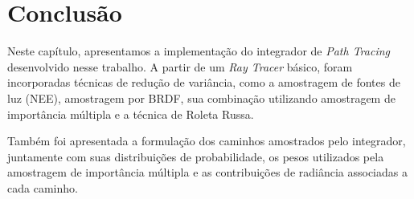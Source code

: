 \section{Conclusão}

Neste capítulo, apresentamos a implementação do integrador de \emph{Path Tracing}
desenvolvido nesse trabalho. A partir de um \emph{Ray Tracer} básico, foram
incorporadas técnicas de redução de variância, como a amostragem de fontes de
luz (NEE), amostragem por BRDF, sua combinação utilizando amostragem de
importância múltipla e a técnica de Roleta Russa. 

Também foi apresentada a formulação dos caminhos amostrados pelo integrador,
juntamente com suas distribuições de probabilidade, os pesos utilizados pela
amostragem de importância múltipla e as  contribuições de radiância associadas
a cada caminho.

